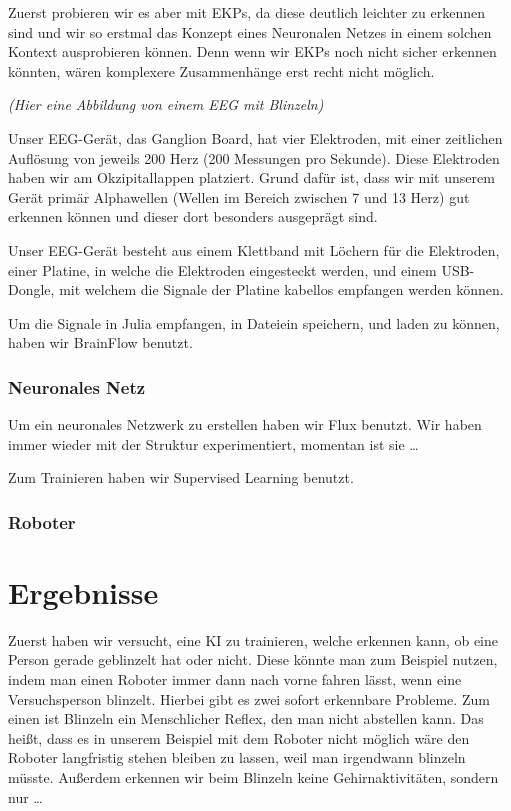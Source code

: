 \documentclass{scrartcl}
\begin{document}
	Zuerst probieren wir es aber mit EKPs, da diese deutlich leichter zu erkennen sind und wir so erstmal das Konzept eines Neuronalen Netzes in einem solchen Kontext ausprobieren können. Denn wenn wir EKPs noch nicht sicher erkennen könnten, wären komplexere Zusammenhänge erst recht nicht möglich.
	 
	\textit{(Hier eine Abbildung von einem EEG mit Blinzeln) }
	
	Unser EEG-Gerät, das Ganglion Board, hat vier Elektroden, mit einer zeitlichen Auflösung von jeweils 200 Herz (200 Messungen pro Sekunde). Diese Elektroden haben wir am Okzipitallappen platziert. Grund dafür ist, dass wir mit unserem Gerät primär Alphawellen (Wellen im Bereich zwischen 7 und 13 Herz) gut erkennen können und dieser dort besonders ausgeprägt sind.
	
	Unser EEG-Gerät besteht aus einem Klettband mit Löchern für die Elektroden, einer Platine, in welche die Elektroden eingesteckt werden, und einem USB-Dongle, mit welchem die Signale der Platine kabellos empfangen werden können.
	
	Um die Signale in Julia empfangen, in Dateiein speichern, und laden zu können, haben wir BrainFlow benutzt.

	\subsubsection{Neuronales Netz}

	Um ein neuronales Netzwerk zu erstellen haben wir Flux benutzt. Wir haben immer wieder mit der Struktur experimentiert, momentan ist sie … 

	Zum Trainieren haben wir Supervised Learning benutzt.

	\subsubsection{Roboter}

	\section{Ergebnisse}

	Zuerst haben wir versucht, eine KI zu trainieren, welche erkennen kann, ob eine Person gerade geblinzelt hat oder nicht. Diese könnte man zum Beispiel nutzen, indem man einen Roboter immer dann nach vorne fahren lässt, wenn eine Versuchsperson blinzelt. Hierbei gibt es zwei sofort erkennbare Probleme. Zum einen ist Blinzeln ein Menschlicher Reflex, den man nicht abstellen kann. Das heißt, dass es in unserem Beispiel mit dem Roboter nicht möglich wäre den Roboter langfristig stehen bleiben zu lassen, weil man irgendwann blinzeln müsste. Außerdem erkennen wir beim Blinzeln keine Gehirnaktivitäten, sondern nur … 
\end{document}
